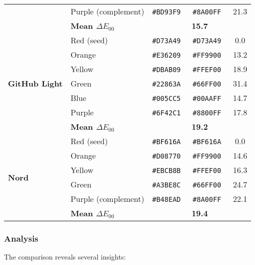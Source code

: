 \documentclass[12pt,a4paper]{article}
\newcommand{\deltaE}{\Delta E_{00}}
\newcommand{\hexcolour}[1]{%
  \definecolor{tempcolour}{HTML}{#1}%
  \texttt{\##1}~\raisebox{0.2ex}{\fboxsep=0pt\fbox{\colorbox{tempcolour}{\phantom{XX}}}}%
}
\begin{document}
\begin{table}[H]
\begin{tabular}{llccc}
& Purple (complement) & \hexcolour{BD93F9} & \hexcolour{8A00FF} & 21.3 \\
\cmidrule{2-5}
& \textbf{Mean $\deltaE$} & \multicolumn{3}{c}{\textbf{15.7}} \\
\midrule
\multirow{7}{*}{\textbf{GitHub Light}} 
& Red (seed) & \hexcolour{D73A49} & \hexcolour{D73A49} & 0.0 \\
& Orange & \hexcolour{E36209} & \hexcolour{FF9900} & 13.2 \\
& Yellow & \hexcolour{DBAB09} & \hexcolour{FFEF00} & 18.9 \\
& Green & \hexcolour{22863A} & \hexcolour{66FF00} & 31.4 \\
& Blue & \hexcolour{005CC5} & \hexcolour{00AAFF} & 14.7 \\
& Purple & \hexcolour{6F42C1} & \hexcolour{8800FF} & 17.8 \\
\cmidrule{2-5}
& \textbf{Mean $\deltaE$} & \multicolumn{3}{c}{\textbf{19.2}} \\
\midrule
\multirow{7}{*}{\textbf{Nord}} 
& Red (seed) & \hexcolour{BF616A} & \hexcolour{BF616A} & 0.0 \\
& Orange & \hexcolour{D08770} & \hexcolour{FF9900} & 14.6 \\
& Yellow & \hexcolour{EBCB8B} & \hexcolour{FFEF00} & 16.3 \\
& Green & \hexcolour{A3BE8C} & \hexcolour{66FF00} & 24.7 \\
& Purple (complement) & \hexcolour{B48EAD} & \hexcolour{8A00FF} & 22.1 \\
\cmidrule{2-5}
& \textbf{Mean $\deltaE$} & \multicolumn{3}{c}{\textbf{19.4}} \\
\bottomrule
\end{tabular}
\end{table}

\subsubsection{Analysis}

The comparison reveals several insights:
\end{document}
